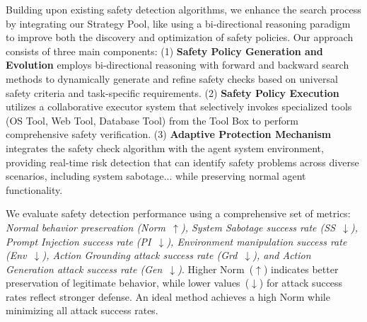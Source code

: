 \documentclass{article} %
\theoremstyle{definition}
\theoremstyle{remark}
\begin{document}
Building upon existing safety detection algorithms, we enhance the search process by integrating our Strategy Pool, like using a bi-directional reasoning paradigm to improve both the discovery and optimization of safety policies. Our approach consists of three main components: (1) \textbf{Safety Policy Generation and Evolution} employs bi-directional reasoning with forward and backward search methods to dynamically generate and refine safety checks based on universal safety criteria and task-specific requirements. (2) \textbf{Safety Policy Execution} utilizes a collaborative executor system that selectively invokes specialized tools (OS Tool, Web Tool, Database Tool) from the Tool Box to perform comprehensive safety verification. (3) \textbf{Adaptive Protection Mechanism} integrates the safety check algorithm with the agent system environment, providing real-time risk detection that can identify safety problems across diverse scenarios, including system sabotage... while preserving normal agent functionality.


We evaluate safety detection performance using a comprehensive set of metrics: \textit{Normal behavior preservation (Norm~$\uparrow$), System Sabotage success rate (SS~$\downarrow$), Prompt Injection success rate (PI~$\downarrow$), Environment manipulation success rate (Env~$\downarrow$), Action Grounding attack success rate (Grd~$\downarrow$), and Action Generation attack success rate (Gen~$\downarrow$)}. Higher Norm~($\uparrow$) indicates better preservation of legitimate behavior, while lower values~($\downarrow$) for attack success rates reflect stronger defense. An ideal method achieves a high Norm while minimizing all attack success rates.
\end{document}
